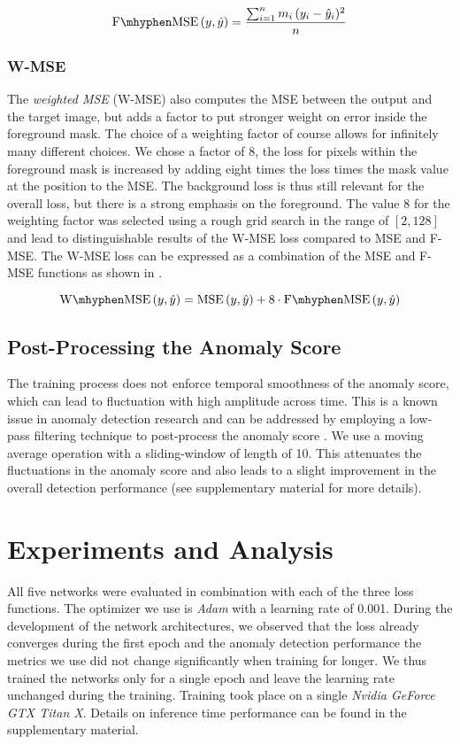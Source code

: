 \documentclass[10pt,twocolumn,letterpaper]{article}
\begin{document}
\begin{equation} \label{eq:fmse}
    \mathrm{F\mhyphen MSE}\,(y, \hat{y}) = \frac{\sum_{i=1}^n m_i \, (y_i - \hat{y}_i)^2}{n}
\end{equation}

\subsubsection{W-MSE}
The \emph{weighted MSE} (W-MSE) also computes the MSE between the output and the target image, but adds a factor to put stronger weight on error inside the foreground mask. The choice of a weighting factor of course allows for infinitely many different choices. We chose a factor of \num{8}, \ie the loss for pixels within the foreground mask is increased by adding eight times the loss times the mask value at the position to the MSE. The background loss is thus still relevant for the overall loss, but there is a strong emphasis on the foreground. The value \num{8} for the weighting factor was selected using a rough grid search in the range of $[2, 128]$ and lead to distinguishable results of the W-MSE loss compared to MSE and F-MSE. The W-MSE loss can be expressed as a combination of the MSE and F-MSE functions as shown in .

\begin{equation} \label{eq:wmse}
    \mathrm{W\mhyphen MSE}\,(y, \hat{y}) = \mathrm{MSE}\,(y, \hat{y}) + 8 \cdot \mathrm{F\mhyphen MSE}\,(y, \hat{y})
\end{equation}

\subsection{Post-Processing the Anomaly Score} \label{sec:post_proc}
The training process does not enforce temporal smoothness of the anomaly score, which can lead to fluctuation with high amplitude across time. This is a known issue in anomaly detection research and can be addressed by employing a low-pass filtering technique to post-process the anomaly score \cite{driver_anomaly_dataset}. We use a moving average operation with a sliding-window of length of \num{10}. This attenuates the fluctuations in the anomaly score and also leads to a slight improvement in the overall detection performance (see supplementary material for more details).

\section{Experiments and Analysis} \label{sec:exp}
All five networks were evaluated in combination with each of the three loss functions. The optimizer we use is \emph{Adam} with a learning rate of \num{0.001}. During the development of the network architectures, we observed that the loss already converges during the first epoch and the anomaly detection performance \wrt the metrics we use did not change significantly when training for longer. We thus trained the networks only for a single epoch and leave the learning rate unchanged during the training. Training took place on a single \emph{Nvidia GeForce GTX Titan X}. Details on inference time performance can be found in the supplementary material.
\end{document}
